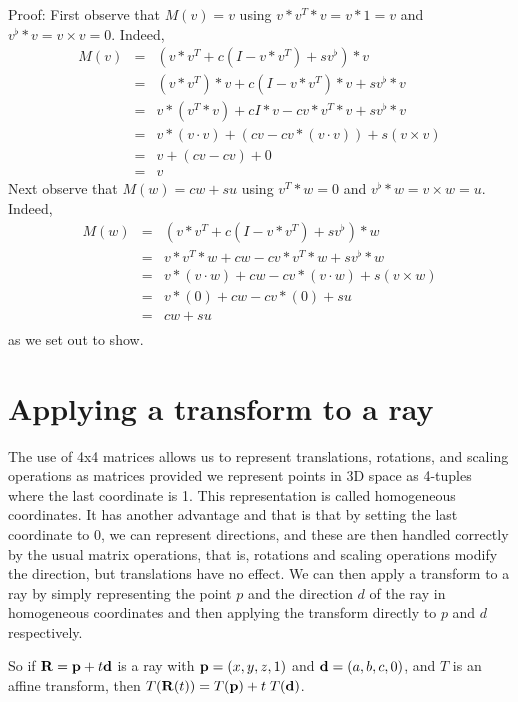 \documentclass{book}
\newcommand{\vect}[1]{{\bf{ #1}}}
\begin{document}
Proof:
First observe that $M(v)=v$ using $v*v^T*v = v*1 = v$ and $v^\flat*v = v\times v = 0$.
Indeed,
\begin{eqnarray*}
M(v) &=& (v*v^T + c(I-v*v^T) + sv^\flat)*v \\
 &=& (v*v^T)*v + c(I-v*v^T)*v + sv^\flat*v \\
 &=& v*(v^T*v) + cI*v -cv*v^T*v + sv^\flat*v \\
 &=& v*(v\cdot v) + (cv -cv*(v\cdot v)) + s(v \times v) \\
 &=& v + (cv-cv) + 0 \\
 &=& v
\end{eqnarray*}
Next observe that $M(w) = cw + su$ using $v^T*w=0$ and $v^\flat*w = v\times w = u$.
Indeed,
\begin{eqnarray*}
M(w) &=& (v*v^T + c(I-v*v^T) + sv^\flat)*w \\
 &=& v*v^T*w + cw-cv*v^T*w + sv^\flat*w \\
 &=& v*(v\cdot w) + cw-cv*(v\cdot w) + s(v \times w) \\
 &=& v*(0) + cw-cv*(0) + su \\
 &=&  cw + su \\
\end{eqnarray*}
as we set out to show.

\section{Applying a transform to a ray}
The use of 4x4 matrices allows us to represent translations, rotations, and scaling operations
as matrices provided we represent points in 3D space as 4-tuples where the last coordinate is 1.
This representation is called homogeneous coordinates. It has another advantage and that is that
by setting the last coordinate to 0, we can represent directions, and these are then handled correctly
by the usual matrix operations, that is, rotations and scaling operations modify the direction, but
translations have no effect. We can then apply a transform to a ray by simply representing the point $p$
and the direction $d$ of the ray in homogeneous coordinates and then applying the transform directly to
$p$ and $d$ respectively.

So if $\vect R = \vect{p}+t\vect{d}$ is a ray with $\vect{p} = (x,y,z,1)$ and $\vect{d} = (a,b,c,0)$, and $T$ is an affine transform, then
$T(\vect R(t)) = T(\vect{p})+t\;T(\vect{d})$.
\end{document}
